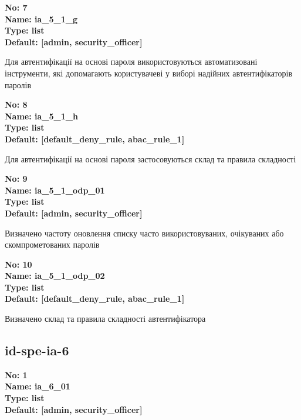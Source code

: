 \documentclass{article}
\begin{document}
{\footnotesize\bfseries
No: 7\\
Name: ia\_\allowbreak{}5\_\allowbreak{}1\_\allowbreak{}g\\
Type: list\\
Default: [\textquotedbl{}admin\textquotedbl{}, \textquotedbl{}security\_\allowbreak{}officer\textquotedbl{}]
}

{\footnotesize Для автентифікації на основі пароля використовуються автоматизовані інструменти, які допомагають користувачеві у виборі надійних автентифікаторів паролів}


{\footnotesize\bfseries
No: 8\\
Name: ia\_\allowbreak{}5\_\allowbreak{}1\_\allowbreak{}h\\
Type: list\\
Default: [\textquotedbl{}default\_\allowbreak{}deny\_\allowbreak{}rule\textquotedbl{}, \textquotedbl{}abac\_\allowbreak{}rule\_\allowbreak{}1\textquotedbl{}]
}

{\footnotesize Для автентифікації на основі пароля застосовуються склад та правила складності}


{\footnotesize\bfseries
No: 9\\
Name: ia\_\allowbreak{}5\_\allowbreak{}1\_\allowbreak{}odp\_\allowbreak{}01\\
Type: list\\
Default: [\textquotedbl{}admin\textquotedbl{}, \textquotedbl{}security\_\allowbreak{}officer\textquotedbl{}]
}

{\footnotesize Визначено частоту оновлення списку часто використовуваних, очікуваних або скомпрометованих паролів}


{\footnotesize\bfseries
No: 10\\
Name: ia\_\allowbreak{}5\_\allowbreak{}1\_\allowbreak{}odp\_\allowbreak{}02\\
Type: list\\
Default: [\textquotedbl{}default\_\allowbreak{}deny\_\allowbreak{}rule\textquotedbl{}, \textquotedbl{}abac\_\allowbreak{}rule\_\allowbreak{}1\textquotedbl{}]
}

{\footnotesize Визначено склад та правила складності автентифікатора}




\subsection{id-spe-ia-6}


\vspace{10pt}
{\footnotesize\bfseries
No: 1\\
Name: ia\_\allowbreak{}6\_\allowbreak{}01\\
Type: list\\
Default: [\textquotedbl{}admin\textquotedbl{}, \textquotedbl{}security\_\allowbreak{}officer\textquotedbl{}]
}
\end{document}
